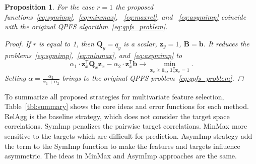 \documentclass[12pt,twoside]{article}
\newtheorem{proposition}{Proposition}
\theoremstyle{definition}
\newcommand{\bz}{\mathbf{z}}
\newcommand{\bb}{\mathbf{b}}
\newcommand{\bB}{\mathbf{B}}
\newcommand{\bQ}{\mathbf{Q}}
\newcommand{\T}{\mathsf{T}}
\newcommand{\bOne}{\boldsymbol{1}}
\newcommand{\bZero}{\boldsymbol{0}}
\begin{document}
\begin{proposition}
	For the case $r=1$ the proposed functions~\eqref{eq:symimp},~\eqref{eq:minmax}, ~\eqref{eq:maxrel}, and ~\eqref{eq:asymimp} coincide with the original QPFS algorithm~\eqref{eq:qpfs_problem}.
	
	\begin{proof}
		If $r$ is equal to 1, then $\bQ_y = q_y$ is a scalar, $\bz_y = 1$, $\bB = \bb$. It reduces the problems~\eqref{eq:symimp},~\eqref{eq:minmax}, and~\eqref{eq:asymimp} to
		\begin{equation*}
		\alpha_1 \cdot \bz_x^{\T} \bQ_x \bz_x - \alpha_2 \cdot \bz_x^{\T} \bb \rightarrow \min_{\bz_x \geq \bZero_n, \, \bOne_n^{\T}\bz_x=1} .
		\end{equation*}
		Setting $\alpha = \frac{\alpha_2}{\alpha_1 + \alpha_2}$ brings to the original QPFS problem~\eqref{eq:qpfs_problem}.
	\end{proof}
\end{proposition}

To summarize all proposed strategies for multivariate feature selection, Table~\ref{tbl:summary} shows the core ideas and error functions for each method. 
RelAgg is the baseline strategy, which does not consider the target space correlations.
SymImp penalizes the pairwise target correlations.
MinMax more sensitive to the targets which are difficult for prediction.
AsymImp strategy add the term to the SymImp function to make the features and targets influence asymmetric. 
The ideas in MinMax and AsymImp approaches are the same. 
\end{document}
